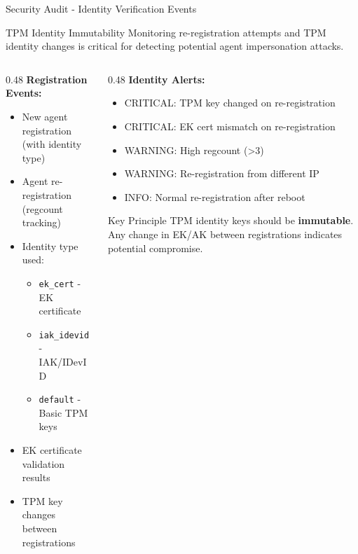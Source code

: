 \begin{frame}{Security Audit - Identity Verification Events}
  \begin{block}{TPM Identity Immutability}
    \scriptsize
    Monitoring re-registration attempts and TPM identity changes is critical for detecting
    potential agent impersonation attacks.
  \end{block}

  \vspace{0.2cm}

  \scriptsize
  \begin{columns}[T]
    \begin{column}{0.48\textwidth}
      \textbf{Registration Events:}
      \begin{itemize}
        \item New agent registration (with identity type)
        \item Agent re-registration (regcount tracking)
        \item Identity type used:
        \begin{itemize}
          \scriptsize
          \item \texttt{ek\_cert} - EK certificate
          \item \texttt{iak\_idevid} - IAK/IDevID
          \item \texttt{default} - Basic TPM keys
        \end{itemize}
        \item EK certificate validation results
        \item TPM key changes between registrations
      \end{itemize}
    \end{column}
    \begin{column}{0.48\textwidth}
      \textbf{Identity Alerts:}
      \begin{itemize}
        \item \textcolor{dangered}{CRITICAL}: TPM key changed on re-registration
        \item \textcolor{dangered}{CRITICAL}: EK cert mismatch on re-registration
        \item \textcolor{warningyellow}{WARNING}: High regcount (>3)
        \item \textcolor{warningyellow}{WARNING}: Re-registration from different IP
        \item \textcolor{infoblue}{INFO}: Normal re-registration after reboot
      \end{itemize}

      \vspace{0.2cm}

      \begin{alertblock}{Key Principle}
        \scriptsize
        TPM identity keys should be \textbf{immutable}. Any change in EK/AK between
        registrations indicates potential compromise.
      \end{alertblock}
    \end{column}
  \end{columns}
\end{frame}
